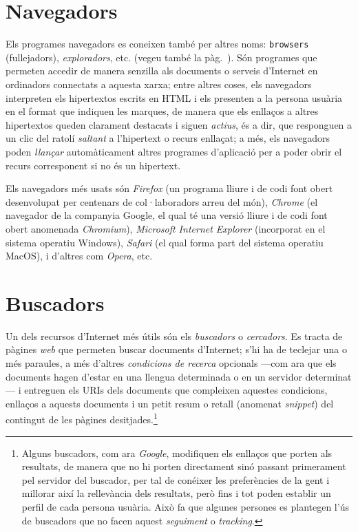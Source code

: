 \section{Navegadors}
\label{ss:navegadors}
Els programes navegadors es coneixen també per altres noms:
\texttt{browsers} (fullejadors), \emph{exploradors}, etc. (vegeu també
la pàg.~\pageref{pg:navegadors}).  Són programes que permeten accedir
de manera senzilla als documents o serveis d'Internet en ordinadors
connectats a aquesta xarxa; entre altres coses, els navegadors
interpreten els hipertextos escrits en HTML i els presenten a la
persona usuària en el format que indiquen les marques, de manera que
els enllaços a altres hipertextos queden clarament destacats i siguen
\emph{actius}, és a dir, que responguen a un clic del ratolí
\emph{saltant} a l'hipertext o recurs enllaçat; a més, els navegadors
poden \emph{llançar} automàticament altres programes d'aplicació per a
poder obrir el recurs corresponent si no és un hipertext. 

Els navegadors més usats són \emph{Firefox} (un programa lliure i de
codi font obert desenvolupat per centenars de col·laboradors arreu del
món), \emph{Chrome} (el navegador de la companyia Google, el qual té
una versió lliure i de codi font obert anomenada \emph{Chromium}),
\emph{Microsoft Internet Explorer} (incorporat en el sistema operatiu
Windows), \emph{Safari} (el qual forma part del sistema operatiu
MacOS), i d'altres com \emph{Opera}, etc.
 

\section{Buscadors}
Un dels recursos d'Internet més útils són els \emph{buscadors} o
\emph{cercadors}. Es tracta de pàgines \emph{web} que permeten buscar
documents d'Internet; s'hi ha de teclejar una o més paraules, a més
d'altres \emph{condicions de recerca} opcionals ---com ara que els
documents hagen d'estar en una llengua determinada o en un servidor
determinat--- i entreguen els URIs dels documents que compleixen
aquestes condicions, enllaços a aquests documents i un petit resum o
retall (anomenat \emph{snippet}) del contingut de les pàgines
desitjades.\footnote{Alguns buscadors, com ara \emph{Google},
  modifiquen els enllaços que porten als resultats, de manera que no
  hi porten directament sinó passant primerament pel servidor del
  buscador, per tal de conéixer les preferències de la gent i millorar
  així la rellevància dels resultats, però fins i tot poden establir
  un perfil de cada persona usuària. Això fa que algunes persones es
  plantegen l'ús de buscadors que no facen aquest \emph{seguiment} o
  \emph{tracking}.}

